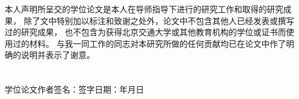 \begin{declaration}
	本人声明所呈交的学位论文是本人在导师指导下进行的研究工作和取得的研究成果，
	除了文中特别加以标注和致谢之处外，论文中不包含其他人已经发表或撰写过的研究成果，
	也不包含为获得北京交通大学或其他教育机构的学位或证书而使用过的材料。
	与我一同工作的同志对本研究所做的任何贡献均已在论文中作了明确的说明并表示了谢意。
	\\
	\\
	\\
	学位论文作者签名：\qquad\qquad\qquad\qquad\qquad 签字日期：\qquad\qquad 年\quad\quad 月\quad\quad 日
\end{declaration}